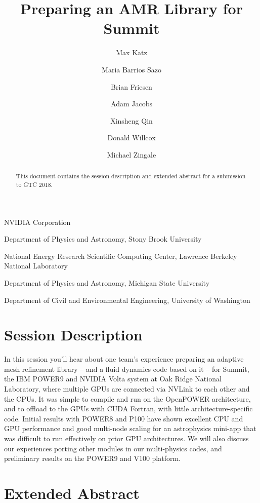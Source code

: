\documentclass[numberedappendix]{aastex6}
\begin{document}
\title{Preparing an AMR Library for Summit}

\author{Max Katz}
\author{Maria Barrios Sazo}
\author{Brian Friesen}
\author{Adam Jacobs}
\author{Xinsheng Qin}
\author{Donald Willcox}
\author{Michael Zingale}

{
  NVIDIA Corporation
}

{
  Department of Physics and Astronomy, Stony Brook University
}

{
  National Energy Research Scientific Computing Center, Lawrence Berkeley National Laboratory
}

{
  Department of Physics and Astronomy, Michigan State University
}

{
  Department of Civil and Environmental Engineering, University of Washington
}

\begin{abstract}
  This document contains the session description and extended abstract for
  a submission to GTC 2018.
\end{abstract}

\section{Session Description}

In this session you'll hear about one team's experience preparing an adaptive mesh
refinement library -- and a fluid dynamics code based on it -- for Summit, the
IBM POWER9 and NVIDIA Volta system at Oak Ridge National Laboratory, where multiple GPUs
are connected via NVLink to each other and the CPUs. It was simple to compile and run on
the OpenPOWER architecture, and to offload to the GPUs with CUDA Fortran, with little
architecture-specific code. Initial results with POWER8 and P100 have shown 
excellent CPU and GPU performance and good multi-node scaling for an astrophysics mini-app
that was difficult to run effectively on prior GPU architectures. We will also discuss
our experiences porting other modules in our multi-physics codes, and preliminary
results on the POWER9 and V100 platform.

\section{Extended Abstract}
\end{document}
